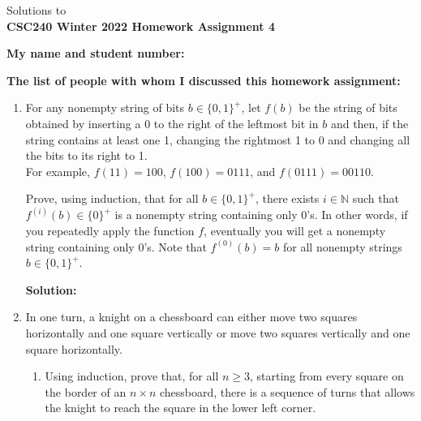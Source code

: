 \documentclass[11pt]{article}
\def\nats {{\mathbb N}}
\begin{document}
\begin{center}
Solutions to\\
{\bf \Large \bf CSC240 Winter 2022 Homework Assignment 4}
\end{center}

\noindent
{\bf My name and student number:}\\

\medskip

\noindent
{\bf The list of people with whom I discussed this homework assignment:}\\


\begin{enumerate}
\item
\begin{question}
For any nonempty string of bits $b \in \{0,1\}^+$,
let $f(b)$ be the string of bits obtained by
inserting a 0 to the right of the leftmost bit in $b$ and then, if the string contains at least one 1,
changing the rightmost 1 to 0 and changing all the bits to its right to 1.\\
For example, $f(11) = 100$, $f(100)  = 0111$, and $f(0111) = 00110$.

Prove, using induction, that for all $b \in \{0,1\}^+$,  there exists $i \in \nats$ such that $f^{(i)}(b) \in \{0\}^+$
 is a nonempty string containing only 0's.
In other words, if you repeatedly apply the function $f$, eventually you will get a nonempty string containing only 0's.
Note that $f^{(0)}(b) = b$ for all nonempty strings $b \in \{0,1\}^+$.
\end{question}

\begin{solution}
{\bf Solution:}\\

\end{solution}


\item
\begin{question}
In one turn, a knight on a chessboard can either move two squares horizontally and one square vertically
or move two squares vertically and one square horizontally.
\end{question}

\begin{enumerate}
\item
\begin{question}
Using induction, prove that, for all $n \geq 3$, starting from every square on the border of an $n \times n$ chessboard, there is a sequence of turns that allows the knight to reach the square in the lower left corner.
\end{question}


\end{enumerate}
\end{enumerate}
\end{document}
